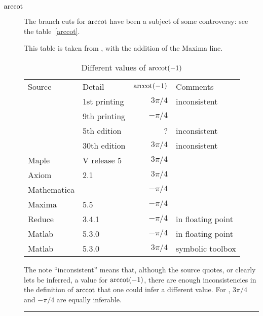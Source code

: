 \documentclass[keylogo]{openmath}
\begin{document}
\begin{description}
\item[$\mathop{\rm arccot}$]The branch cuts for $\mathop{\rm arccot}$ have been a subject of some
controversy: see the table~\ref{arccot}.\begin{table}[t]

\vspace*{-\baselineskip}
\small

\caption{Different values of $\mathop{\rm arccot}(-1)$}
This table is taken from \cite{CDJW}, with the addition of the Maxima line.
\par\noindent
\begin{tabular}{llrl}
Source&Detail&$\mathop{\rm arccot}(-1)$&Comments\\
\cite{AS}&1st printing&$3\pi/4$&inconsistent\\
\cite{AS}&9th printing&$-\pi/4$\\
\cite{GR}&5th edition&?&inconsistent\\
\cite{CRC}&30th edition&$3\pi/4$&inconsistent\\
Maple&V release 5&$3\pi/4$\\
Axiom&2.1&$3\pi/4$\\
Mathematica&\cite{Mma}&$-\pi/4$\\
Maxima&5.5&$-\pi/4$\\
Reduce&3.4.1&$-\pi/4$&in floating point\\
Matlab&5.3.0&$-\pi/4$&in floating point\\
Matlab&5.3.0&$3\pi/4$&symbolic toolbox
\end{tabular}


\noindent
The note ``inconsistent'' means that, although the source quotes, or
clearly lets be inferred, a value for $\mathop{\rm arccot}(-1)$, there are enough
inconsistencies in the definition of $\mathop{\rm arccot}$ that one could infer a
different value. For \cite{GR}, $3\pi/4$ and $-\pi/4$ are equally
inferable.

\smallskip

\hrule


\end{table}
\end{description}
\end{document}
